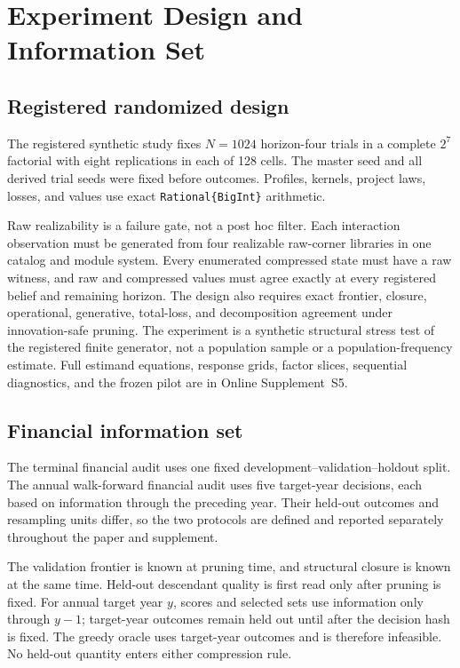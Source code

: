 \section{Experiment Design and Information Set}\label{app:protocol}

\subsection{Registered randomized design}\label{app:protocol-randomized}

The registered synthetic study fixes \(N=1024\) horizon-four trials in a
complete \(2^7\) factorial with eight replications in each of 128 cells.  The
master seed and all derived trial seeds were fixed before outcomes.  Profiles,
kernels, project laws, losses, and values use exact
\texttt{Rational\{BigInt\}} arithmetic.

Raw realizability is a failure gate, not a post hoc filter.  Each interaction
observation must be generated from four realizable raw-corner libraries in one
catalog and module system.  Every enumerated compressed state must have a raw
witness, and raw and compressed values must agree exactly at every registered
belief and remaining horizon.  The design also requires exact frontier,
closure, operational, generative, total-loss, and decomposition agreement
under innovation-safe pruning.  The experiment is a synthetic structural
stress test of the registered finite generator, not a population sample or a
population-frequency estimate.  Full estimand equations, response grids,
factor slices, sequential diagnostics, and the frozen pilot are in Online
Supplement~S5.

\subsection{Financial information set}\label{app:protocol-financial}

The terminal financial audit uses one fixed development--validation--holdout
split.  The annual walk-forward financial audit uses five target-year
decisions, each based on information through the preceding year.  Their
held-out outcomes and resampling units differ, so the two protocols are
defined and reported separately throughout the paper and supplement.

The validation frontier is known at pruning time, and structural closure is
known at the same time.  Held-out descendant quality is first read only after
pruning is fixed.  For annual target year \(y\), scores and selected sets use
information only through \(y-1\); target-year outcomes remain held out until
after the decision hash is fixed.  The greedy oracle uses target-year outcomes
and is therefore infeasible.  No held-out quantity enters either compression
rule.

